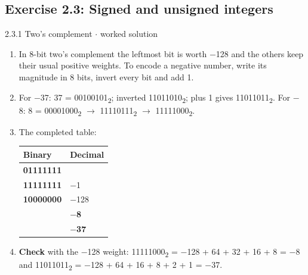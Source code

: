 \documentclass[11pt]{article}
\begin{document}
\begin{keepsection}\subsection{Exercise 2.3: Signed and unsigned integers}

\begin{workedbox}{2.3.1 Two’s complement \ensuremath{\cdot} worked solution}
\begin{enumerate}
\item In 8-bit two's complement the leftmost bit is worth \ensuremath{-}128 and the others keep their usual positive weights. To encode a negative number, write its magnitude in 8 bits, invert every bit and add 1.
\item For \ensuremath{-}37: 37 = 00100101\textsubscript{2}; inverted 11011010\textsubscript{2}; plus 1 gives 11011011\textsubscript{2}. For \ensuremath{-}8: 8 = 00001000\textsubscript{2} \ensuremath{\to} 11110111\textsubscript{2} \ensuremath{\to} 11111000\textsubscript{2}.
\item {}
The completed table:

\begin{center}\small\begin{tabularx}{\linewidth}{>{\raggedright\arraybackslash}X>{\raggedright\arraybackslash}X}\toprule
\textbf{Binary} & \textbf{Decimal} \\ \midrule
\textbf{01111111} & 127 \\
\textbf{11111111} & \ensuremath{-}1 \\
\textbf{10000000} & \ensuremath{-}128 \\
11111000 & \textbf{\ensuremath{-}8} \\
11011011 & \textbf{\ensuremath{-}37} \\
\bottomrule\end{tabularx}\end{center}
\item \textbf{Check} with the \ensuremath{-}128 weight: 11111000\textsubscript{2} = \ensuremath{-}128 + 64 + 32 + 16 + 8 = \ensuremath{-}8 and 11011011\textsubscript{2} = \ensuremath{-}128 + 64 + 16 + 8 + 2 + 1 = \ensuremath{-}37.
\end{enumerate}
\end{workedbox}

\end{keepsection}
\end{document}
